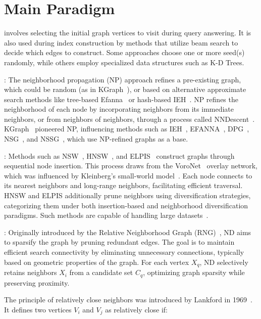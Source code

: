 \section{Main Paradigm}

 involves selecting the initial graph vertices to visit during query answering. It is also used during index construction by methods that utilize beam search to decide which edges to construct. Some approaches choose one or more seed(s) randomly, while others employ specialized data structures such as K-D Trees.

: The neighborhood propagation (NP) approach refines a pre-existing graph, which could be random (as in KGraph~\cite{kgraph}), or based on alternative approximate search methods like tree-based Efanna~\cite{efanna} or hash-based IEH~\cite{ieh}. NP refines the neighborhood of each node by incorporating neighbors from its immediate neighbors, or from neighbors of neighbors, through a process called NNDescent~\cite{nndescent}. KGraph~\cite{kgraph} pioneered NP, influencing methods such as IEH~\cite{ieh}, EFANNA~\cite{efanna}, DPG~\cite{dpg}, NSG~\cite{nsg}, and NSSG~\cite{nssg}, which use NP-refined graphs as a base.

: Methods such as NSW~\cite{nsw14}, HNSW~\cite{hnsw}, and ELPIS~\cite{elpis} construct graphs through sequential node insertion. This process draws from the VoroNet~\cite{voronet} overlay network, which was influenced by Kleinberg’s small-world model~\cite{kleinberg2000,kleinberg2002}. Each node connects to its nearest neighbors and long-range neighbors, facilitating efficient traversal. HNSW and ELPIS additionally prune neighbors using diversification strategies, categorizing them under both insertion-based and neighborhood diversification paradigms. Such methods are capable of handling large datasets~\cite{ann-benchmark-journal,elpis}.

: Originally introduced by the Relative Neighborhood Graph (RNG)~\cite{rng}, ND aims to sparsify the graph by pruning redundant edges. The goal is to maintain efficient search connectivity by eliminating unnecessary connections, typically based on geometric properties of the graph. For each vertex \(X_q\), ND selectively retains neighbors \(X_i\) from a candidate set \(C_q\), optimizing graph sparsity while preserving proximity.

The principle of relatively close neighbors was introduced by Lankford in 1969~\cite{lankford69}. It defines two vertices \(V_i\) and \(V_j\) as relatively close if:

